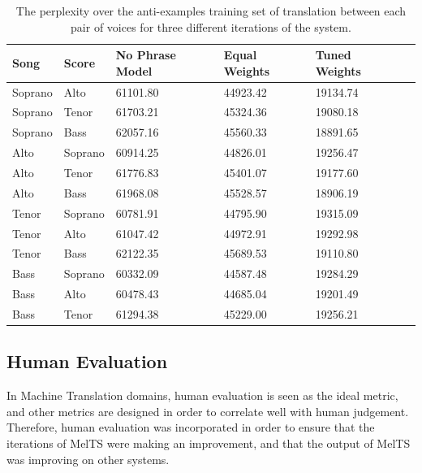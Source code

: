 \documentclass{sig-alternate}
\begin{document}
\begin{table}[t]
      \begin{tabular}{| l | l | l | l | l | l |}
      \hline
     Song & Score & No Phrase Model & Equal Weights & Tuned Weights \\ \hline
     Soprano & Alto & 61101.80 & 44923.42 & 19134.74 \\ 
     Soprano & Tenor & 61703.21 & 45324.36 & 19080.18 \\ 
     Soprano & Bass & 62057.16 & 45560.33 & 18891.65 \\ 
     Alto & Soprano & 60914.25 & 44826.01 & 19256.47 \\ 
     Alto & Tenor & 61776.83 & 45401.07 & 19177.60 \\ 
     Alto & Bass & 61968.08 & 45528.57 & 18906.19 \\ 
     Tenor & Soprano & 60781.91 & 44795.90 & 19315.09 \\ 
     Tenor & Alto & 61047.42 & 44972.91 & 19292.98 \\ 
     Tenor & Bass & 62122.35 & 45689.53 & 19110.80 \\ 
     Bass & Soprano & 60332.09 & 44587.48 & 19284.29 \\ 
     Bass & Alto & 60478.43 & 44685.04 & 19201.49 \\ 
     Bass & Tenor & 61294.38 & 45229.00 & 19256.21 \\ \hline
        \end{tabular}
  \caption{The perplexity over the anti-examples training set of translation between each pair of voices for three different iterations of the system.}
\end{table}

\subsection{Human Evaluation}
In Machine Translation domains, human evaluation is seen as the ideal metric, and other metrics are designed in order to correlate well with human judgement. Therefore, human evaluation was incorporated in order to ensure that the iterations of MelTS were making an improvement, and that the output of MelTS was improving on other systems.
\end{document}
